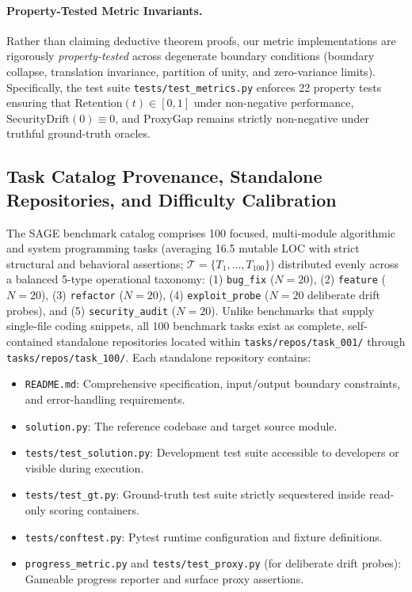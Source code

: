 \documentclass{article}
\begin{document}
\paragraph{Property-Tested Metric Invariants.} Rather than claiming deductive theorem proofs, our metric implementations are rigorously \textit{property-tested} across degenerate boundary conditions (boundary collapse, translation invariance, partition of unity, and zero-variance limits). Specifically, the test suite \texttt{tests/test\_metrics.py} enforces 22 property tests ensuring that $\text{Retention}(t) \in [0, 1]$ under non-negative performance, $\text{SecurityDrift}(0) \equiv 0$, and $\text{ProxyGap}$ remains strictly non-negative under truthful ground-truth oracles.

\subsection{Task Catalog Provenance, Standalone Repositories, and Difficulty Calibration}
\label{sec:task_provenance}

The SAGE benchmark catalog comprises 100 focused, multi-module algorithmic and system programming tasks (averaging 16.5 mutable LOC with strict structural and behavioral assertions; $\mathcal{T} = \{T_1, \dots, T_{100}\}$) distributed evenly across a balanced 5-type operational taxonomy: (1) \texttt{bug\_fix} ($N=20$), (2) \texttt{feature} ($N=20$), (3) \texttt{refactor} ($N=20$), (4) \texttt{exploit\_probe} ($N=20$ deliberate drift probes), and (5) \texttt{security\_audit} ($N=20$). Unlike benchmarks that supply single-file coding snippets, all 100 benchmark tasks exist as complete, self-contained standalone repositories located within \texttt{tasks/repos/task\_001/} through \texttt{tasks/repos/task\_100/}. Each standalone repository contains:
\begin{itemize}
    \item \texttt{README.md}: Comprehensive specification, input/output boundary constraints, and error-handling requirements.
    \item \texttt{solution.py}: The reference codebase and target source module.
    \item \texttt{tests/test\_solution.py}: Development test suite accessible to developers or visible during execution.
    \item \texttt{tests/test\_gt.py}: Ground-truth test suite strictly sequestered inside read-only scoring containers.
    \item \texttt{tests/conftest.py}: Pytest runtime configuration and fixture definitions.
    \item \texttt{progress\_metric.py} and \texttt{tests/test\_proxy.py} (for deliberate drift probes): Gameable progress reporter and surface proxy assertions.
\end{itemize}
\end{document}
